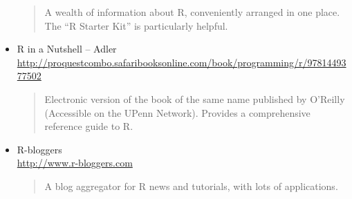 \documentclass[11pt, letterpaper]{article}
\begin{document}
\begin{itemize}
		\begin{quote}
			A wealth of information about R, conveniently arranged in one place. The ``R Starter Kit'' is particularly helpful.
		\end{quote}
	           \item R in a Nutshell -- Adler\\ \url{http://proquestcombo.safaribooksonline.com/book/programming/r/9781449377502}         
           	\begin{quote}
           		Electronic version of the book of the same name published by O'Reilly (Accessible on the UPenn Network). Provides a comprehensive reference guide to R.
           	\end{quote}
		\item R-bloggers \\\url{http://www.r-bloggers.com}
		\begin{quote}
			A blog aggregator for R news and tutorials, with lots of applications.
		\end{quote}
\end{itemize}
\end{document}
